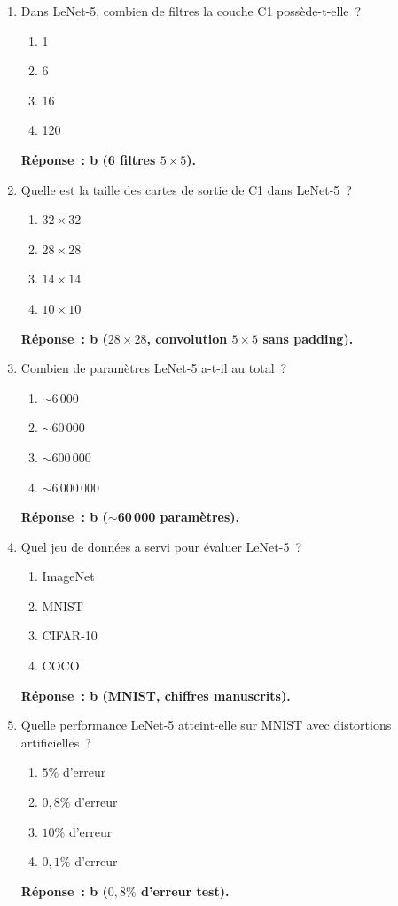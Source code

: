 \documentclass[a4paper,11pt]{article}
\theoremstyle{definition}
\theoremstyle{remark}
\begin{document}
\begin{enumerate}
  \item Dans LeNet-5, combien de filtres la couche C1
    poss\`ede-t-elle~?
    \begin{enumerate}
      \item 1
      \item 6
      \item 16
      \item 120
    \end{enumerate}
    \textbf{R\'eponse~: b (6 filtres $5\times5$).}

  \item Quelle est la taille des cartes de sortie de C1 dans
    LeNet-5~?
    \begin{enumerate}
      \item $32\times32$
      \item $28\times28$
      \item $14\times14$
      \item $10\times10$
    \end{enumerate}
    \textbf{R\'eponse~: b ($28\times28$, convolution $5\times5$
    sans padding).}

  \item Combien de param\`etres LeNet-5 a-t-il au total~?
    \begin{enumerate}
      \item $\sim$6\,000
      \item $\sim$60\,000
      \item $\sim$600\,000
      \item $\sim$6\,000\,000
    \end{enumerate}
    \textbf{R\'eponse~: b ($\sim$60\,000 param\`etres).}

  \item Quel jeu de donn\'ees a servi pour \'evaluer LeNet-5~?
    \begin{enumerate}
      \item ImageNet
      \item MNIST
      \item CIFAR-10
      \item COCO
    \end{enumerate}
    \textbf{R\'eponse~: b (MNIST, chiffres manuscrits).}

  \item Quelle performance LeNet-5 atteint-elle sur MNIST avec
    distortions artificielles~?
    \begin{enumerate}
      \item $5\%$ d'erreur
      \item $0{,}8\%$ d'erreur
      \item $10\%$ d'erreur
      \item $0{,}1\%$ d'erreur
    \end{enumerate}
    \textbf{R\'eponse~: b ($0{,}8\%$ d'erreur test).}


\end{enumerate}
\end{document}
